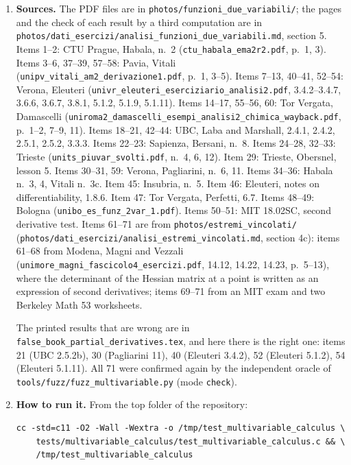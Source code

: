 \documentclass[11pt,a4paper]{article}
\begin{document}
\begin{enumerate}
\item \textbf{Sources.} The PDF files are in \texttt{photos/funzioni\_due\_variabili/}; the pages and the check of each result by a third computation are in \texttt{photos/dati\_esercizi/analisi\_funzioni\_due\_variabili.md}, section 5. Items 1--2: CTU Prague, Habala, n.~2 (\texttt{ctu\_habala\_ema2r2.pdf}, p.~1, 3). Items 3--6, 37--39, 57--58: Pavia, Vitali (\texttt{unipv\_vitali\_am2\_derivazione1.pdf}, p.~1, 3--5). Items 7--13, 40--41, 52--54: Verona, Eleuteri (\texttt{univr\_eleuteri\_eserciziario\_analisi2.pdf}, 3.4.2--3.4.7, 3.6.6, 3.6.7, 3.8.1, 5.1.2, 5.1.9, 5.1.11). Items 14--17, 55--56, 60: Tor Vergata, Damascelli (\texttt{uniroma2\_damascelli\_esempi\_analisi2\_chimica\_wayback.pdf}, p.~1--2, 7--9, 11). Items 18--21, 42--44: UBC, Laba and Marshall, 2.4.1, 2.4.2, 2.5.1, 2.5.2, 3.3.3. Items 22--23: Sapienza, Bersani, n.~8. Items 24--28, 32--33: Trieste (\texttt{units\_piuvar\_svolti.pdf}, n.~4, 6, 12). Item 29: Trieste, Obersnel, lesson 5. Items 30--31, 59: Verona, Pagliarini, n.~6, 11. Items 34--36: Habala n.~3, 4, Vitali n.~3c. Item 45: Insubria, n.~5. Item 46: Eleuteri, notes on differentiability, 1.8.6. Item 47: Tor Vergata, Perfetti, 6.7. Items 48--49: Bologna (\texttt{unibo\_es\_funz\_2var\_1.pdf}). Items 50--51: MIT 18.02SC, second derivative test. Items 61--71 are from \texttt{photos/estremi\_vincolati/} (\texttt{photos/dati\_esercizi/analisi\_estremi\_vincolati.md}, section 4c): items 61--68 from Modena, Magni and Vezzali (\texttt{unimore\_magni\_fascicolo4\_esercizi.pdf}, 14.12, 14.22, 14.23, p.~5--13), where the determinant of the Hessian matrix at a point is written as an expression of second derivatives; items 69--71 from an MIT exam and two Berkeley Math 53 worksheets.

The printed results that are wrong are in \texttt{false\_book\_partial\_derivatives.tex}, and here there is the right one: items 21 (UBC 2.5.2b), 30 (Pagliarini 11), 40 (Eleuteri 3.4.2), 52 (Eleuteri 5.1.2), 54 (Eleuteri 5.1.11). All 71 were confirmed again by the independent oracle of \texttt{tools/fuzz/fuzz\_multivariable.py} (mode \texttt{check}).

\item \textbf{How to run it.} From the top folder of the repository:
\begin{verbatim}
cc -std=c11 -O2 -Wall -Wextra -o /tmp/test_multivariable_calculus \
    tests/multivariable_calculus/test_multivariable_calculus.c && \
    /tmp/test_multivariable_calculus
\end{verbatim}
\end{enumerate}
\end{document}
